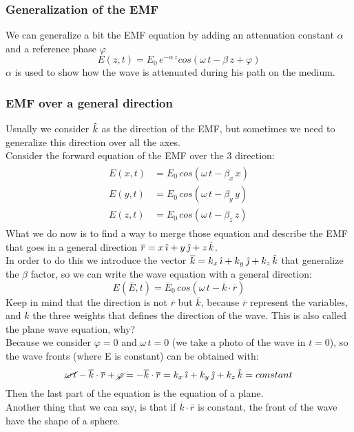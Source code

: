 \subsubsection*{Generalization of the EMF}
We can generalize a bit the EMF equation by adding an attenuation constant $\alpha$ and a reference phase $\varphi$
\begin{equation}\label{eq:wave_equation_generalized}
    E(z,t)=E_0\,e^{-\alpha\,z}cos(\omega\,t-\beta\,z+\varphi)
\end{equation}
$\alpha$ is used to show how the wave is attenuated during his path on the medium.
\subsubsection*{EMF over a general direction}
Usually we consider $\hat{\mathnormal{k}}$ as the direction of the EMF, but sometimes we need to generalize this direction over all the axes.\\
Consider the forward equation of the EMF over the 3 direction:
\begin{align}\label{eq:electric_field_3_axes}
    \begin{split}
        E(x,t)&=E_0\,cos(\omega\,t-\beta_x\,x)\\[5pt]
        E(y,t)&=E_0\,cos(\omega\,t-\beta_y\,y)\\[5pt]
        E(z,t)&=E_0\,cos(\omega\,t-\beta_z\,z)
    \end{split}
\end{align}
What we do now is to find a way to merge those equation and describe the EMF that goes in a general direction $\overline{r}=x\,\hat{\imath}+y\,\hat{\jmath}+z\,\hat{\mathnormal{k}}$.\\
In order to do this we introduce the vector $\overline{k}=k_x\,\hat{\imath}+k_y\,\hat{\jmath}+k_z\,\hat{\mathnormal{k}}$ that generalize the $\beta$ factor, so we can write the wave equation with a general direction:
\begin{equation}
    E(\overline{E},t)=\overline{E}_0\,cos(\omega\,t-\overline{k}\cdot\overline{r})
\end{equation}
Keep in mind that the direction is not $\overline{r}$ but $\overline{k}$, because $\overline{r}$ represent the variables, and $\overline{k}$ the three weights that defines the direction of the wave.
This is also called the plane wave equation, why?\\
Because we consider $\varphi = 0$ and $\omega\,t=0$ (we take a photo of the wave in $t=0$), so the wave fronts (where E is constant) can be obtained with:
\begin{equation}
    \cancel{\omega\,t}-\overline{k}\cdot\overline{r}+\cancel{\varphi}=-\overline{k}\cdot\overline{r}=k_x\,\hat{\imath}+k_y\,\hat{\jmath}+k_z\,\hat{\mathnormal{k}}=constant
\end{equation}
Then the last part of the equation is the equation of a plane.\\
Another thing that we can say, is that if $\overline{k}\cdot\overline{r}$ is constant, the front of the wave have the shape of a sphere.